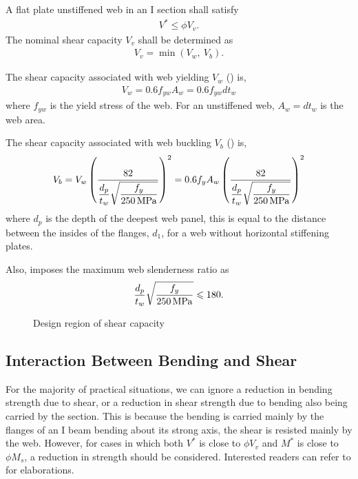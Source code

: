 A flat plate unstiffened web in an I section shall satisfy
\begin{gather}
V^*\leqslant\phi{}V_v.
\end{gather}
The nominal shear capacity $V_v$ shall be determined as
\begin{gather}
V_v=\min\left(V_w,~V_b\right).
\end{gather}

The shear capacity associated with web yielding $V_w$ () is,
\begin{gather}
V_w=0.6f_{yw}A_w=0.6f_{yw}dt_w
\end{gather}
where $f_{yw}$ is the yield stress of the web.
For an unstiffened web, $A_w=dt_w$ is the web area.

The shear capacity associated with web buckling $V_b$ () is,
\begin{gather}
V_b=V_w\left(\dfrac{82}{\dfrac{d_p}{t_w}\sqrt{\dfrac{f_y}{\SI{250}{\mega\pascal}}}}\right)^2=0.6f_yA_w\left(\dfrac{82}{\dfrac{d_p}{t_w}\sqrt{\dfrac{f_y}{\SI{250}{\mega\pascal}}}}\right)^2
\end{gather}
where $d_p$ is the depth of the deepest web panel, this is equal to the distance between the insides of the flanges, $d_1$, for a web without horizontal stiffening plates.

Also,  imposes the maximum web slenderness ratio as
\begin{gather}
\dfrac{d_p}{t_w}\sqrt{\dfrac{f_y}{\SI{250}{\mega\pascal}}}\leqslant180.
\end{gather}
\begin{figure}[H]
\centering\caption{Design region of shear capacity}
\end{figure}
\subsection{Interaction Between Bending and Shear}
For the majority of practical situations, we can ignore a reduction in bending strength due to shear, or a reduction in shear strength due to bending also being carried by the section.
This is because the bending is carried mainly by the flanges of an I beam bending about its strong axis, the shear is resisted mainly by the web.
However, for cases in which both $V^*$ is close to $\phi{}V_v$ and $M^*$ is close to $\phi{}M_s$, a reduction in strength should be considered.
Interested readers can refer to \citet{JCWRCA1971} for elaborations.


